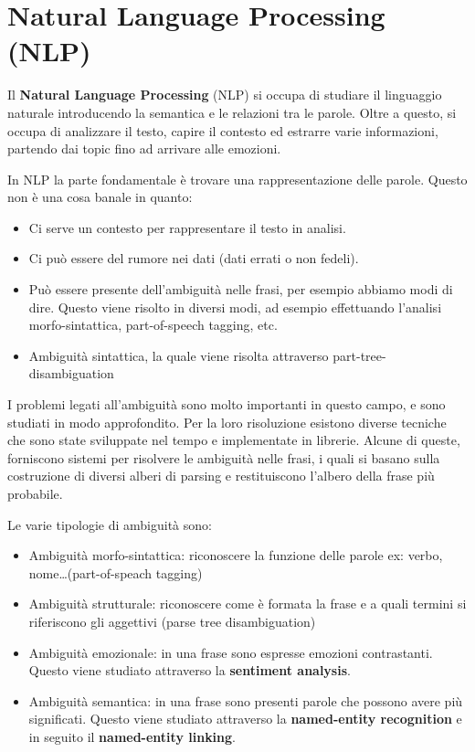 \chapter{Natural Language Processing (NLP)}
Il \textbf{Natural Language Processing} (NLP) si occupa di studiare il linguaggio
naturale introducendo la semantica e le relazioni tra le parole. Oltre a questo,
si occupa di analizzare il testo, capire il contesto ed estrarre varie informazioni,
partendo dai topic fino ad arrivare alle emozioni.

In NLP la parte fondamentale è trovare una rappresentazione delle parole. Questo
non è una cosa banale in quanto:
\begin{itemize}
      \item Ci serve un contesto per rappresentare il testo in analisi.
      \item Ci può essere del rumore nei dati (dati errati o non fedeli).
      \item Può essere presente dell'ambiguità nelle frasi, per esempio abbiamo
            modi di dire. Questo viene risolto in diversi modi, ad esempio
            effettuando l'analisi morfo-sintattica, part-of-speech tagging, etc.
      \item Ambiguità sintattica, la quale viene risolta attraverso part-tree-disambiguation
\end{itemize}
I problemi legati all'ambiguità sono molto importanti in questo campo, e sono
studiati in modo approfondito. Per la loro risoluzione esistono diverse tecniche
che sono state sviluppate nel tempo e implementate in librerie.
Alcune di queste, forniscono sistemi per risolvere le ambiguità nelle frasi, i
quali si basano sulla costruzione di diversi alberi di parsing e restituiscono
l'albero della frase più probabile.

Le varie tipologie di ambiguità sono:
\begin{itemize}
      \item Ambiguità morfo-sintattica: riconoscere la funzione delle parole ex: verbo, nome\dots (part-of-speach tagging)
      \item Ambiguità strutturale: riconoscere come è formata la frase e a quali termini si riferiscono gli aggettivi (parse tree disambiguation)
      \item Ambiguità emozionale: in una frase sono espresse emozioni contrastanti.
            Questo viene studiato attraverso la \textbf{sentiment analysis}.
      \item Ambiguità semantica: in una frase sono presenti parole che possono
            avere più significati. Questo viene studiato attraverso la
            \textbf{named-entity recognition} e in seguito il \textbf{named-entity
                  linking}.
\end{itemize}
